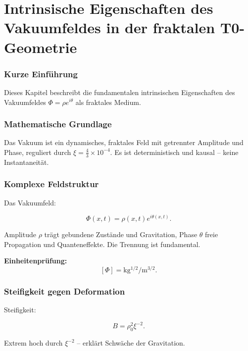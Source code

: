 \chapter{Intrinsische Eigenschaften des Vakuumfeldes in der fraktalen T0-Geometrie}


	
	\subsection*{Kurze Einführung}
	
	Dieses Kapitel beschreibt die fundamentalen intrinsischen Eigenschaften des Vakuumfeldes \(\Phi = \rho e^{i\theta}\) als fraktales Medium.
	
	\subsection*{Mathematische Grundlage}
	
	Das Vakuum ist ein dynamisches, fraktales Feld mit getrennter Amplitude und Phase, reguliert durch \(\xi = \frac{4}{3} \times 10^{-4}\). Es ist deterministisch und kausal – keine Instantaneität.
	
	\subsection*{Komplexe Feldstruktur}
	
	Das Vakuumfeld:
	
	\begin{equation}
		\Phi(x,t) = \rho(x,t) e^{i \theta(x,t)}.
	\end{equation}
	
	Amplitude \(\rho\) trägt gebundene Zustände und Gravitation, Phase \(\theta\) freie Propagation und Quanteneffekte. Die Trennung ist fundamental.
	
	\textbf{Einheitenprüfung:}
	\[
	[\Phi] = \si{\kilo\gram^{1/2}\per\meter^{3/2}}.
	\]
	
	\subsection*{Steifigkeit gegen Deformation}
	
	Steifigkeit:
	
	\begin{equation}
		B = \rho_0^2 \xi^{-2}.
	\end{equation}
	
	Extrem hoch durch \(\xi^{-2}\) – erklärt Schwäche der Gravitation.
	

